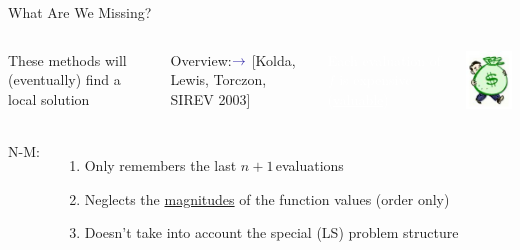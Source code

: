 \documentclass[handout,aspectratio=54]{beamer}
\numberwithin{theorem}{section}
\begin{document}
\begin{frame}{What Are We Missing?}
\begin{columns}
These methods will (eventually) find a local solution

\scriptsize\flushright
Overview:$\textcolor{blue}{\rightarrow}$\textcolor[RGB]{128,0,128}{ [Kolda, Lewis, Torczon, SIREV 2003]}

\normalsize\flushleft
\colorbox[rgb]{0.5,0.6,0.7}{\textcolor{white}{Each evaluation of $f$ is expensive (\underline{valuable})}}

\includegraphics[width=\textwidth]{fig/19.jpg}
\end{columns}

\vspace{0.2cm}
\begin{columns}
N-M:
\begin{enumerate}\small
\item Only remembers the last $n+1$\,evaluations
\item Neglects the \underline{magnitudes} of the function values (order only)
\item Doesn’t take into account the special (LS) problem structure
\end{enumerate}


\end{columns}
\end{frame}
\end{document}
